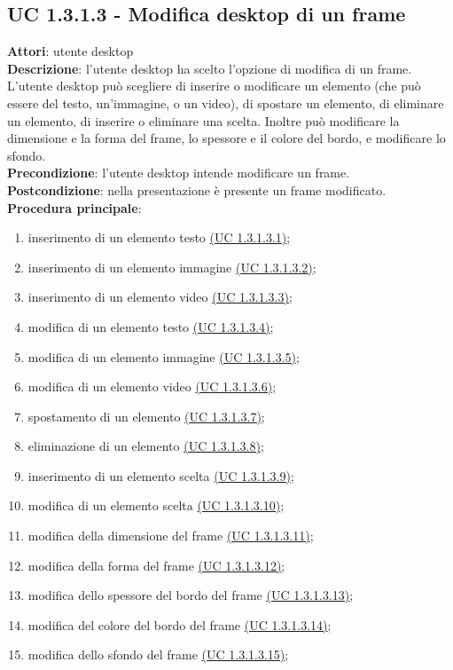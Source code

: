 \subsection{UC 1.3.1.3 - Modifica desktop di un frame}{
	\label{uc1.3.1.3}
	\textbf{Attori}: utente desktop \\
	\textbf{Descrizione}: l'utente desktop ha scelto l'opzione di modifica di un frame. L'utente desktop può scegliere di inserire o modificare un elemento (che può essere del testo, un'immagine, o un video), di spostare un elemento, di eliminare un elemento, di inserire o eliminare una scelta. Inoltre può modificare la dimensione e la forma del frame, lo spessore e il colore del bordo, e modificare lo sfondo. \\
	\textbf{Precondizione}: l'utente desktop intende modificare un frame.	\\
	\textbf{Postcondizione}: nella presentazione è presente un frame modificato.	\\
	\textbf{Procedura principale}:
	\begin{enumerate}
		\item inserimento di un elemento testo \hyperref[uc1.3.1.3.1]{(UC 1.3.1.3.1)};
		\item inserimento di un elemento immagine \hyperref[uc1.3.1.3.2]{(UC 1.3.1.3.2)};
		\item inserimento di un elemento video \hyperref[uc1.3.1.3.3]{(UC 1.3.1.3.3)};
		\item modifica di un elemento testo \hyperref[uc1.3.1.3.4]{(UC 1.3.1.3.4)};
		\item modifica di un elemento immagine \hyperref[uc1.3.1.3.5]{(UC 1.3.1.3.5)};
		\item modifica di un elemento video \hyperref[uc1.3.1.3.6]{(UC 1.3.1.3.6)};
		\item spostamento di un elemento \hyperref[uc1.3.1.3.7]{(UC 1.3.1.3.7)};
		\item eliminazione di un elemento \hyperref[uc1.3.1.3.8]{(UC 1.3.1.3.8)};
		\item inserimento di un elemento scelta \hyperref[uc1.3.1.3.9]{(UC 1.3.1.3.9)};
		\item modifica di un elemento scelta \hyperref[uc1.3.1.3.10]{(UC 1.3.1.3.10)};
		\item modifica della dimensione del frame \hyperref[uc1.3.1.3.11]{(UC 1.3.1.3.11)};
		\item modifica della forma del frame \hyperref[uc1.3.1.3.12]{(UC 1.3.1.3.12)};
		\item modifica dello spessore del bordo del frame \hyperref[uc1.3.1.3.13]{(UC 1.3.1.3.13)};
		\item modifica del colore del bordo del frame \hyperref[uc1.3.1.3.14]{(UC 1.3.1.3.14)};
		\item modifica dello sfondo del frame \hyperref[uc1.3.1.3.15]{(UC 1.3.1.3.15)};
	\end{enumerate}
	}
